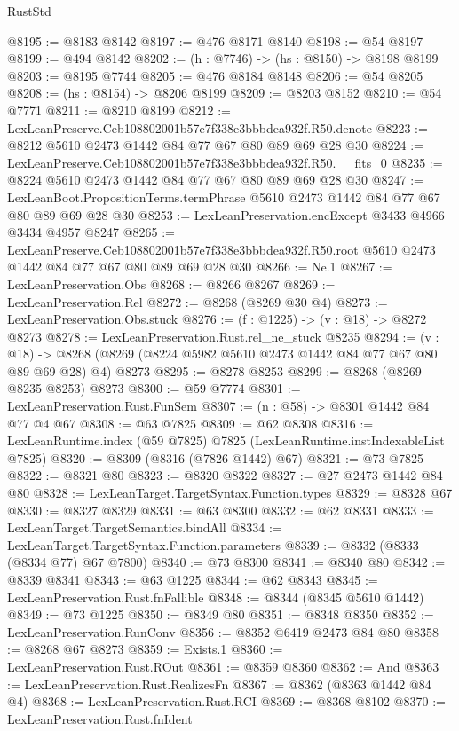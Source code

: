 \begin{lexlean}{RustStd}
\begin{coremodule}
@8195 := @8183 @8142
@8197 := @476 @8171 @8140
@8198 := @54 @8197
@8199 := @494 @8142
@8202 := (h : @7746) -> (hs : @8150) -> @8198 @8199
@8203 := @8195 @7744
@8205 := @476 @8184 @8148
@8206 := @54 @8205
@8208 := (hs : @8154) -> @8206 @8199
@8209 := @8203 @8152
@8210 := @54 @7771
@8211 := @8210 @8199
@8212 := LexLeanPreserve.Ceb108802001b57e7f338e3bbbdea932f.R50.denote
@8223 := @8212 @5610 @2473 @1442 @84 @77 @67 @80 @89 @69 @28 @30
@8224 := LexLeanPreserve.Ceb108802001b57e7f338e3bbbdea932f.R50.__fits_0
@8235 := @8224 @5610 @2473 @1442 @84 @77 @67 @80 @89 @69 @28 @30
@8247 := LexLeanBoot.PropositionTerms.termPhrase @5610 @2473 @1442 @84 @77 @67 @80 @89 @69 @28 @30
@8253 := LexLeanPreservation.encExcept @3433 @4966 @3434 @4957 @8247
@8265 := LexLeanPreserve.Ceb108802001b57e7f338e3bbbdea932f.R50.root
    @5610
    @2473
    @1442
    @84
    @77
    @67
    @80
    @89
    @69
    @28
    @30
@8266 := Ne.{1}
@8267 := LexLeanPreservation.Obs
@8268 := @8266 @8267
@8269 := LexLeanPreservation.Rel
@8272 := @8268 (@8269 @30 @4)
@8273 := LexLeanPreservation.Obs.stuck
@8276 := (f : @1225) -> (v : @18) -> @8272 @8273
@8278 := LexLeanPreservation.Rust.rel_ne_stuck @8235
@8294 := (v : @18) ->
  @8268 (@8269 (@8224 @5982 @5610 @2473 @1442 @84 @77 @67 @80 @89 @69 @28) @4) @8273
@8295 := @8278 @8253
@8299 := @8268 (@8269 @8235 @8253) @8273
@8300 := @59 @7774
@8301 := LexLeanPreservation.Rust.FunSem
@8307 := (n : @58) -> @8301 @1442 @84 @77 @4 @67
@8308 := @63 @7825
@8309 := @62 @8308
@8316 := LexLeanRuntime.index (@59 @7825) @7825 (LexLeanRuntime.instIndexableList @7825)
@8320 := @8309 (@8316 (@7826 @1442) @67)
@8321 := @73 @7825
@8322 := @8321 @80
@8323 := @8320 @8322
@8327 := @27 @2473 @1442 @84 @80
@8328 := LexLeanTarget.TargetSyntax.Function.types
@8329 := @8328 @67
@8330 := @8327 @8329
@8331 := @63 @8300
@8332 := @62 @8331
@8333 := LexLeanTarget.TargetSemantics.bindAll
@8334 := LexLeanTarget.TargetSyntax.Function.parameters
@8339 := @8332 (@8333 (@8334 @77) @67 @7800)
@8340 := @73 @8300
@8341 := @8340 @80
@8342 := @8339 @8341
@8343 := @63 @1225
@8344 := @62 @8343
@8345 := LexLeanPreservation.Rust.fnFallible
@8348 := @8344 (@8345 @5610 @1442)
@8349 := @73 @1225
@8350 := @8349 @80
@8351 := @8348 @8350
@8352 := LexLeanPreservation.RunConv
@8356 := @8352 @6419 @2473 @84 @80
@8358 := @8268 @67 @8273
@8359 := Exists.{1}
@8360 := LexLeanPreservation.Rust.ROut
@8361 := @8359 @8360
@8362 := And
@8363 := LexLeanPreservation.Rust.RealizesFn
@8367 := @8362 (@8363 @1442 @84 @4)
@8368 := LexLeanPreservation.Rust.RCI
@8369 := @8368 @8102
@8370 := LexLeanPreservation.Rust.fnIdent

\end{coremodule}
\end{lexlean}

